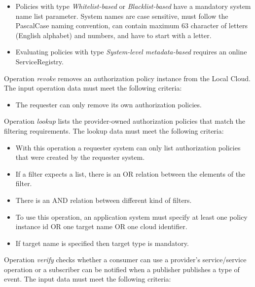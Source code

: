 \documentclass[a4paper]{arrowhead}
\begin{document}
\begin{itemize}
\begin{itemize}
        \end{itemize}
    \item Policies with type \textit{Whitelist-based} or \textit{Blacklist-based} have a mandatory system name list parameter. System names are case sensitive, must follow the PascalCase naming convention, can contain maximum 63 character of letters (English alphabet) and numbers, and have to start with a letter.
    \item Evaluating policies with type \textit{System-level metadata-based} requires an online ServiceRegistry.
\end{itemize}


Operation \textit{revoke} removes an authorization policy instance from the Local Cloud. The input operation data must meet the following criteria:

\begin{itemize}
    \item The requester can only remove its own authorization policies.
\end{itemize}


Operation \textit{lookup} lists the provider-owned authorization policies that match the filtering requirements. The lookup data must meet the following criteria:

\begin{itemize}
    \item With this operation a requester system can only list authorization policies that were created by the requester system.
    \item If a filter expects a list, there is an OR relation between the elements of the filter.
    \item There is an AND relation between different kind of filters.
    \item To use this operation, an application system must specify at least one policy instance id OR one target name OR one cloud identifier.
    \item If target name is specified then target type is mandatory.
\end{itemize}


Operation \textit{verify} checks whether a consumer can use a provider's service/service operation or a subscriber can be notified when a publisher publishes a type of event. The input data must meet the following criteria:
\end{document}
